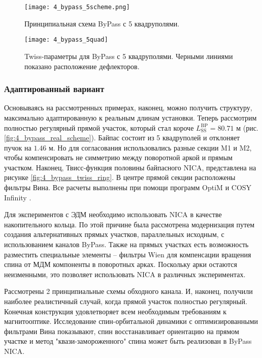 \begin{figure}[!h]
  \centering
   \texttt{[image: 4\_bypass\_5scheme.png]}
   \caption{Принципиальная схема ByPass с 5 квадруполями.}
   \label{fig:4_bypass_5scheme}
\end{figure}

\begin{figure}[!h]
  \centering
   \texttt{[image: 4\_bypass\_5quad]}
   \caption{Twiss-параметры для ByPass с 5 квадруполями. Черными линиями показано расположение дефлекторов.}
   \label{fig:4_bypass_5quad}
\end{figure}

\subsubsection{Адаптированный вариант}\label{sec:EDM/Wien_filter/ByPass/final}

\par Основываясь на рассмотренных примерах, наконец, можно получить структуру, максимально адаптированную к реальным длинам установки. Теперь рассмотрим полностью регулярный прямой участок, который стал короче $L_{\textrm{SS}}^{\textrm{BP}}=80.71$ м (рис. \ref{fig:4_bypass_real_scheme}). Байпас состоит из 5 квадруполей и отклоняет пучок на $1.46$ м. Но для согласования использовались разные секции M1 и M2, чтобы компенсировать не симметрию между поворотной аркой и прямым участком. Наконец, Твисс-функция половины байпасного NICA, представлена на рисунке \ref{fig:4_bypass_twiss_ring}. В центре прямой секции расположены фильтры Вина. Все расчеты выполнены при помощи программ OptiM \cite{optim} и COSY Infinity \cite{cosy}.

\par Для экспериментов с ЭДМ необходимо использовать NICA в качестве накопительного кольца. По этой причине была рассмотрена модернизация путем создания альтернативных прямых участков, параллельных исходным, с использованием каналов ByPass. Также на прямых участках есть возможность разместить специальные элементы – фильтры Wien для компенсации вращения спина от МДМ компоненты в поворотных арках. Поскольку арки остаются неизменными, это позволяет использовать NICA в различных экспериментах.
\par Рассмотрены 2 принципиальные схемы обходного канала. И, наконец, получили наиболее реалистичный случай, когда прямой участок полностью регулярный. Конечная конструкция удовлетворяет всем необходимым требованиям к магнитооптике. Исследование спин-орбитальной динамики с оптимизированными фильтрами Вина показывают, спин восстанавливает ориентацию на прямом участке и метод "квази-замороженного" спина может быть реализован в ByPass NICA.

